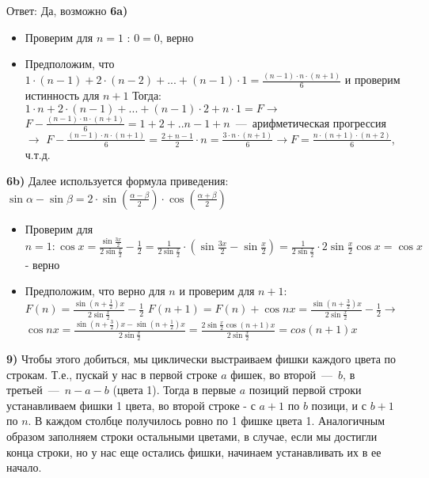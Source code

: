 \documentclass[12pt,a4paper,fleqn]{article}
\begin{document}
Ответ: Да, возможно \newline
{\bf 6a)} 
\begin{itemize}
\item Проверим для $n = 1$ : $0 = 0$, верно \newline
\item Предположим, что $1\cdot(n-1) + 2\cdot(n-2) + ... + (n-1)\cdot1 = \frac{(n-1) \cdot n \cdot (n+1)}{6}$ и проверим истинность для $n + 1$ \newline
Тогда: $1 \cdot n + 2 \cdot (n -1) + ... + (n - 1) \cdot 2 + n \cdot 1 = F \rightarrow$ \newline
$F - \frac{(n-1) \cdot n \cdot (n+1)}{6} = 1 + 2 + .. n - 1 + n$~---~арифметическая прогрессия $\rightarrow$ \newline
$F - \frac{(n-1) \cdot n \cdot (n+1)}{6} = \frac{2 + n - 1}{2} \cdot n = \frac{3 \cdot n \cdot (n + 1)}{6} \rightarrow F = \frac{n \cdot (n+1) \cdot (n+2)}{6}$, ч.т.д. \newline
\end{itemize}
{\bf 6b)} Далее используется формула приведения: $\sin \alpha - \sin \beta = 2 \cdot \sin (\frac{\alpha - \beta}{2}) \cdot \cos (\frac{\alpha + \beta}{2})$ 
\begin{itemize}
\item Проверим для $n = 1: \cos x = \frac{\sin \frac{3x}{2}}{2 \sin \frac{x}{2}} - \frac{1}{2} = \frac{1}{2 \sin \frac{x}{2}} \cdot (\sin \frac{3x}{2} - \sin \frac{x}{2}) = \frac{1}{2 \sin \frac{x}{2}} \cdot 2 \sin \frac{x}{2} \cos x = \cos x$ - верно \newline
\item Предположим, что верно для $n$ и проверим для $n + 1$: \newline
$F (n) = \frac{\sin (n + \frac{1}{2})x}{2 \sin \frac{x}{2}} - \frac{1}{2}$ \newline
$F (n+1) = F (n) + \cos nx = \frac{\sin (n + \frac{3}{2})x}{2 \sin \frac{x}{2}} - \frac{1}{2} \rightarrow$ \newline
$\cos nx = \frac{\sin (n + \frac{3}{2})x - \sin (n + \frac{1}{2})x}{2 \sin \frac{x}{2}} = \frac{2 \sin \frac{x}{2} \cos (n+1)x}{2 \sin \frac{x}{2}} = cos (n+1)x$  
\end{itemize}
{\bf 9)} Чтобы этого добиться, мы циклически выстраиваем фишки каждого цвета по строкам. Т.е., пускай у нас в первой строке $a$ фишек, во второй~---~$b$, в третьей~---~$n - a - b$ (цвета 1). Тогда в первые $a$ позиций первой строки устанавливаем фишки 1 цвета, во второй строке - с $a + 1$ по $b$ позици, и с $b + 1$ по $n$. В каждом столбце получилось ровно по 1 фишке цвета 1. Аналогичным образом заполняем строки остальными цветами, в случае, если мы достигли конца строки, но у нас еще остались фишки, начинаем устанавливать их в ее начало.
\end{document}

